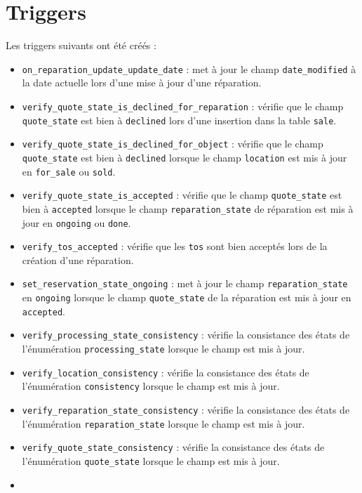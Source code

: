 \documentclass{article}
\newcommand{\ttt}{\texttt}
\begin{document}
    \section{Triggers}

    Les triggers suivants ont été créés :
    \begin{itemize}
        \item \ttt{on\_reparation\_update\_update\_date} : met à jour le champ \ttt{date\_modified} à la date actuelle lors d'une mise à jour d'une réparation.
        \item \ttt{verify\_quote\_state\_is\_declined\_for\_reparation} : vérifie que le champ \ttt{quote\_state} est bien à \ttt{declined} lors d'une insertion dans la table \ttt{sale}.
        \item \ttt{verify\_quote\_state\_is\_declined\_for\_object} : vérifie que le champ \ttt{quote\_state} est bien à \ttt{declined} lorsque le champ \ttt{location} est mis à jour en \ttt{for\_sale} ou \ttt{sold}.
        \item \ttt{verify\_quote\_state\_is\_accepted} : vérifie que le champ \ttt{quote\_state} est bien à \ttt{accepted} lorsque le champ \ttt{reparation\_state} de réparation est mis à jour en \ttt{ongoing} ou \ttt{done}.
        \item \ttt{verify\_tos\_accepted} : vérifie que les \ttt{tos} sont bien acceptés lors de la création d'une réparation.
        \item \ttt{set\_reservation\_state\_ongoing} : met à jour le champ \ttt{reparation\_state} en \ttt{ongoing} lorsque le champ \ttt{quote\_state} de la réparation est mis à jour en \ttt{accepted}.
        \item \ttt{verify\_processing\_state\_consistency} : vérifie la consistance des états de l'énumération \ttt{processing\_state} lorsque le champ est mis à jour.
        \item \ttt{verify\_location\_consistency} : vérifie la consistance des états de l'énumération \ttt{consistency} lorsque le champ est mis à jour.
        \item \ttt{verify\_reparation\_state\_consistency} : vérifie la consistance des états de l'énumération \ttt{reparation\_state} lorsque le champ est mis à jour.
        \item \ttt{verify\_quote\_state\_consistency} : vérifie la consistance des états de l'énumération \ttt{quote\_state} lorsque le champ est mis à jour.
        \item
    \end{itemize}
\end{document}
